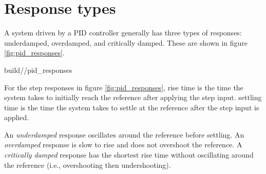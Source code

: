 \section{Response types}

A \gls{system} driven by a PID controller generally has three types of
responses: underdamped, overdamped, and critically damped. These are shown in
figure \ref{fig:pid_responses}.
\begin{svg}{build/\chapterpath/pid_responses}
  \caption{PID controller response types}
  \label{fig:pid_responses}
\end{svg}

For the \glspl{step response} in figure \ref{fig:pid_responses}, \gls{rise time}
is the time the \gls{system} takes to initially reach the \gls{reference} after
applying the \gls{step input}. \Gls{settling time} is the time the \gls{system}
takes to settle at the \gls{reference} after the \gls{step input} is applied.

An \textit{underdamped} response oscillates around the \gls{reference} before
settling. An \textit{overdamped} response is slow to rise and does not overshoot
the \gls{reference}. A \textit{critically damped} response has the shortest
\gls{rise time} without oscillating around the \gls{reference} (i.e.,
overshooting then undershooting).
